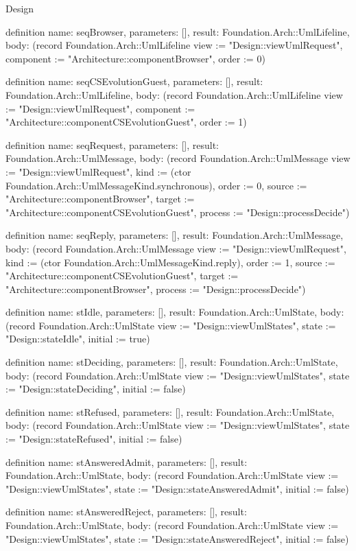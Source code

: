 \begin{lexlean}{Design}
\begin{semanticmodule}
definition{
  name: seqBrowser,
  parameters: [],
  result: Foundation.Arch::UmlLifeline,
  body: (record Foundation.Arch::UmlLifeline {view := "Design::viewUmlRequest", component := "Architecture::componentBrowser", order := 0})
}

definition{
  name: seqCSEvolutionGuest,
  parameters: [],
  result: Foundation.Arch::UmlLifeline,
  body: (record Foundation.Arch::UmlLifeline {view := "Design::viewUmlRequest", component := "Architecture::componentCSEvolutionGuest", order := 1})
}

definition{
  name: seqRequest,
  parameters: [],
  result: Foundation.Arch::UmlMessage,
  body: (record Foundation.Arch::UmlMessage {view := "Design::viewUmlRequest", kind := (ctor Foundation.Arch::UmlMessageKind.synchronous), order := 0, source := "Architecture::componentBrowser", target := "Architecture::componentCSEvolutionGuest", process := "Design::processDecide"})
}

definition{
  name: seqReply,
  parameters: [],
  result: Foundation.Arch::UmlMessage,
  body: (record Foundation.Arch::UmlMessage {view := "Design::viewUmlRequest", kind := (ctor Foundation.Arch::UmlMessageKind.reply), order := 1, source := "Architecture::componentCSEvolutionGuest", target := "Architecture::componentBrowser", process := "Design::processDecide"})
}

definition{
  name: stIdle,
  parameters: [],
  result: Foundation.Arch::UmlState,
  body: (record Foundation.Arch::UmlState {view := "Design::viewUmlStates", state := "Design::stateIdle", initial := true})
}

definition{
  name: stDeciding,
  parameters: [],
  result: Foundation.Arch::UmlState,
  body: (record Foundation.Arch::UmlState {view := "Design::viewUmlStates", state := "Design::stateDeciding", initial := false})
}

definition{
  name: stRefused,
  parameters: [],
  result: Foundation.Arch::UmlState,
  body: (record Foundation.Arch::UmlState {view := "Design::viewUmlStates", state := "Design::stateRefused", initial := false})
}

definition{
  name: stAnsweredAdmit,
  parameters: [],
  result: Foundation.Arch::UmlState,
  body: (record Foundation.Arch::UmlState {view := "Design::viewUmlStates", state := "Design::stateAnsweredAdmit", initial := false})
}

definition{
  name: stAnsweredReject,
  parameters: [],
  result: Foundation.Arch::UmlState,
  body: (record Foundation.Arch::UmlState {view := "Design::viewUmlStates", state := "Design::stateAnsweredReject", initial := false})
}


\end{semanticmodule}
\end{lexlean}
